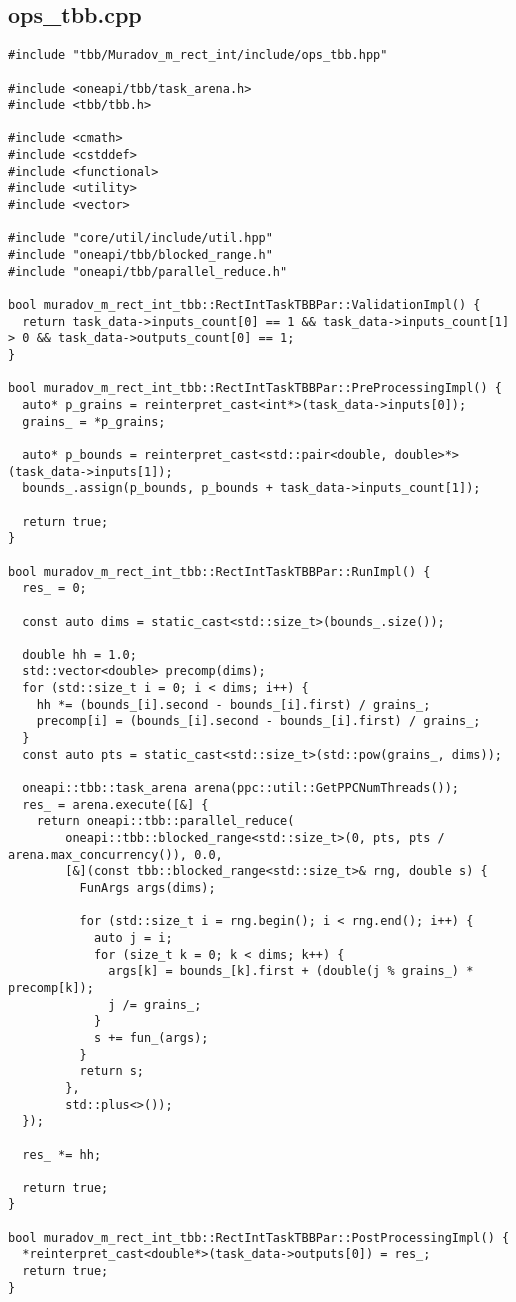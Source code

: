 \documentclass[12pt,a4paper]{extarticle}
\begin{document}
\subsection{ops\_tbb.cpp}
\begin{lstlisting}
#include "tbb/Muradov_m_rect_int/include/ops_tbb.hpp"

#include <oneapi/tbb/task_arena.h>
#include <tbb/tbb.h>

#include <cmath>
#include <cstddef>
#include <functional>
#include <utility>
#include <vector>

#include "core/util/include/util.hpp"
#include "oneapi/tbb/blocked_range.h"
#include "oneapi/tbb/parallel_reduce.h"

bool muradov_m_rect_int_tbb::RectIntTaskTBBPar::ValidationImpl() {
  return task_data->inputs_count[0] == 1 && task_data->inputs_count[1] > 0 && task_data->outputs_count[0] == 1;
}

bool muradov_m_rect_int_tbb::RectIntTaskTBBPar::PreProcessingImpl() {
  auto* p_grains = reinterpret_cast<int*>(task_data->inputs[0]);
  grains_ = *p_grains;

  auto* p_bounds = reinterpret_cast<std::pair<double, double>*>(task_data->inputs[1]);
  bounds_.assign(p_bounds, p_bounds + task_data->inputs_count[1]);

  return true;
}

bool muradov_m_rect_int_tbb::RectIntTaskTBBPar::RunImpl() {
  res_ = 0;

  const auto dims = static_cast<std::size_t>(bounds_.size());

  double hh = 1.0;
  std::vector<double> precomp(dims);
  for (std::size_t i = 0; i < dims; i++) {
    hh *= (bounds_[i].second - bounds_[i].first) / grains_;
    precomp[i] = (bounds_[i].second - bounds_[i].first) / grains_;
  }
  const auto pts = static_cast<std::size_t>(std::pow(grains_, dims));

  oneapi::tbb::task_arena arena(ppc::util::GetPPCNumThreads());
  res_ = arena.execute([&] {
    return oneapi::tbb::parallel_reduce(
        oneapi::tbb::blocked_range<std::size_t>(0, pts, pts / arena.max_concurrency()), 0.0,
        [&](const tbb::blocked_range<std::size_t>& rng, double s) {
          FunArgs args(dims);

          for (std::size_t i = rng.begin(); i < rng.end(); i++) {
            auto j = i;
            for (size_t k = 0; k < dims; k++) {
              args[k] = bounds_[k].first + (double(j % grains_) * precomp[k]);
              j /= grains_;
            }
            s += fun_(args);
          }
          return s;
        },
        std::plus<>());
  });

  res_ *= hh;

  return true;
}

bool muradov_m_rect_int_tbb::RectIntTaskTBBPar::PostProcessingImpl() {
  *reinterpret_cast<double*>(task_data->outputs[0]) = res_;
  return true;
}
\end{lstlisting}
\end{document}

